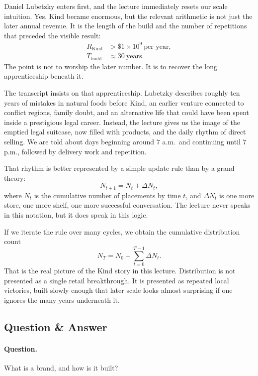 Daniel Lubetzky enters first, and the lecture immediately resets our scale intuition. Yes, Kind became enormous, but the relevant arithmetic is not just the later annual revenue. It is the length of the build and the number of repetitions that preceded the visible result:
\begin{align}
R_{\mathrm{Kind}} &> \$1\times 10^{9}\ \text{per year},\\
T_{\mathrm{build}} &\approx 30\ \text{years}.
\end{align}
The point is not to worship the later number. It is to recover the long apprenticeship beneath it.

The transcript insists on that apprenticeship. Lubetzky describes roughly ten years of mistakes in natural foods before Kind, an earlier venture connected to conflict regions, family doubt, and an alternative life that could have been spent inside a prestigious legal career. Instead, the lecture gives us the image of the emptied legal suitcase, now filled with products, and the daily rhythm of direct selling. We are told about days beginning around \(7\) a.m.\ and continuing until \(7\) p.m., followed by delivery work and repetition.

That rhythm is better represented by a simple update rule than by a grand theory:
\begin{equation}
N_{t+1}=N_t+\Delta N_t,
\end{equation}
where \(N_t\) is the cumulative number of placements by time \(t\), and \(\Delta N_t\) is one more store, one more shelf, one more successful conversation. The lecture never speaks in this notation, but it does speak in this logic.

If we iterate the rule over many cycles, we obtain the cumulative distribution count
\begin{equation}
N_T = N_0 + \sum_{t=0}^{T-1}\Delta N_t.
\end{equation}
That is the real picture of the Kind story in this lecture. Distribution is not presented as a single retail breakthrough. It is presented as repeated local victories, built slowly enough that later scale looks almost surprising if one ignores the many years underneath it.

\subsection{Question \& Answer}

\paragraph{Question.} What is a brand, and how is it built?

